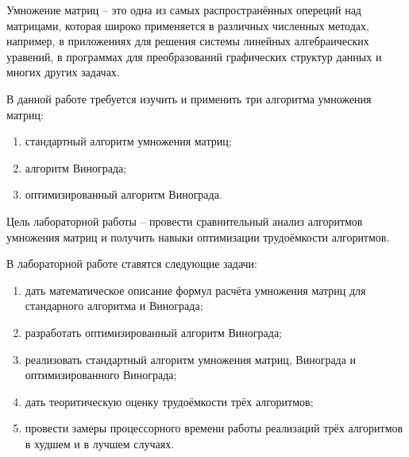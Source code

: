 \Introduction    
    Умножение матриц -- это одна из самых распространённых опереций над матрицами,
    которая широко применяется в различных численных методах, например, в приложениях 
    для решения системы линейных алгебраических уравений, в программах для 
    преобразований графических структур данных и многих других задачах.

    В данной работе требуется изучить и применить три алгоритма умножения матриц:
    \begin{enumerate}
        \item стандартный алгоритм умножения матриц;
        \item алгоритм Винограда;
        \item оптимизированный алгоритм Винограда.
    \end{enumerate}

    Цель лабораторной работы -- провести сравнительный анализ алгоритмов умножения матриц
    и получить навыки оптимизации трудоёмкости алгоритмов.

    В лабораторной работе ставятся следующие задачи:
     \begin{enumerate}
         \item дать математическое описание формул расчёта умножения матриц для стандарного алгоритма и Винограда;
         \item разработать оптимизированный алгоритм Винограда;
         \item реализовать стандартный алгоритм умножения матриц, Винограда и оптимизированного Винограда;
         \item дать теоритическую оценку трудоёмкости трёх алгоритмов;
         \item провести замеры процессорного времени работы реализаций трёх алгоритмов в худшем и в лучшем случаях.
     \end{enumerate}

\newpage
